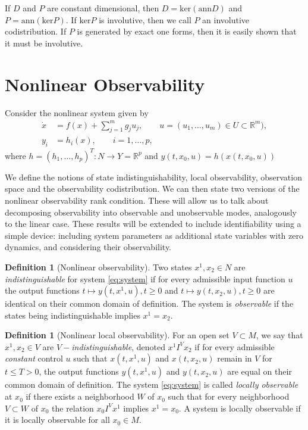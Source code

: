 \documentclass[psamsfonts]{amsart}
\theoremstyle{definition}
\newtheorem{defn}[thm]{Definition}
\theoremstyle{remark}
\newcommand*\R{\mathds{R}}
\numberwithin{equation}{section}
\begin{document}
If $D$ and $P$ are constant dimensional, then $D = \text{ker}( \text{ann} D)$ and $P = \text{ann}(\text{ker} P)$. If $\text{ker} P$ is involutive, then we call $P$ an involutive codistribution. If $P$ is generated by exact one forms, then it is easily shown that it must be involutive. 


\section{Nonlinear Observability}
Consider the nonlinear system given by 
\begin{equation}
    \begin{aligned}
        \dot x & = {} f(x) + \sum_{j = 1}^m g_j u_j, \qquad u = (u_1, \dots, u_m) \in U\subset \R^m), \\
        y_i & = {} h_i(x), \qquad i = 1, \dots, p,
    \end{aligned}\label{eq:system}
\end{equation}
where $h = (h_1, \dots, h_p)^T:N\rightarrow Y=\R^p$ and $y(t, x_0, u) = h(x(t, x_0, u))$

We define the notions of state indistinguishability, local observability, observation space and the observability codistribution. We can then state two versions of the nonlinear observability rank condition. These will allow us to talk about decomposing observability into observable and unobservable modes, analogously to the linear case. These results will be extended to include identifiability using a simple device: including system parameters as additional state variables with zero dynamics, and considering their observability. 

\begin{defn}[Nonlinear observability]
    Two states $x^1, x_2\in N$ are \textit{indistinguishable} for system \eqref{eq:system} if for every admissible input function $u$ the output functions $t\mapsto y(t, x^1, u), t\geq 0$ and $t\mapsto y(t, x_2, u), t\geq 0$ are identical on their common domain of definition. The system is \textit{observable} if the states being indistinguishable implies $x^1=x_2$. 
\end{defn}

\begin{defn}[Nonlinear local observability]
    For an open set $V\subset M$, we say that $x^1, x_2 \in V$ are \textit{$V-$indistinguishable}, denoted $x^1 I^V x_2$ if for every admissible \textit{constant} control $u$ such that $x(t, x^1, u)$ and $x(t, x_2, u)$ remain in $V$ for $t\leq T > 0$, the output functions $y(t, x^1, u)$ and $y(t, x_2, u)$ are equal on their common domain of definition. The system \eqref{eq:system} is called \textit{locally observable} at $x_0$ if there exists a neighborhood $W$ of $x_0$ such that for every neighborhood $V\subset W$ of $x_0$ the relation $x_0 I^V x^1$ implies $x^1 = x_0$. A system is locally observable if it is locally observable for all $x_0 \in M$. 
\end{defn}
\end{document}
